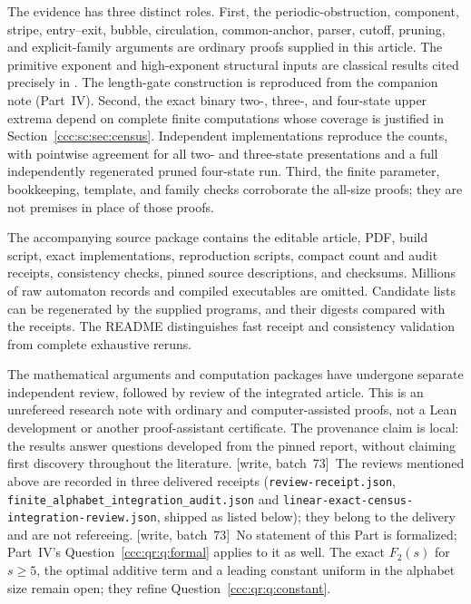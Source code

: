 \documentclass[11pt,letterpaper]{article}
\theoremstyle{definition}
\theoremstyle{remark}
\newcommand{\wsevthree}{\textup{[write, batch~73]}}
\begin{document}
The evidence has three distinct roles. First, the periodic-obstruction, component, stripe, entry--exit, bubble, circulation, common-anchor, parser, cutoff, pruning, and explicit-family arguments are ordinary proofs supplied in this article. The primitive exponent and high-exponent structural inputs are classical results cited precisely in \cite{KOV}. The length-gate construction is reproduced from the companion note (Part~IV). Second, the exact binary two-, three-, and four-state upper extrema depend on complete finite computations whose coverage is justified in Section~\ref{ccc:sc:sec:census}. Independent implementations reproduce the counts, with pointwise agreement for all two- and three-state presentations and a full independently regenerated pruned four-state run. Third, the finite parameter, bookkeeping, template, and family checks corroborate the all-size proofs; they are not premises in place of those proofs.

The accompanying source package contains the editable article, PDF, build script, exact implementations, reproduction scripts, compact count and audit receipts, consistency checks, pinned source descriptions, and checksums. Millions of raw automaton records and compiled executables are omitted. Candidate lists can be regenerated by the supplied programs, and their digests compared with the receipts. The README distinguishes fast receipt and consistency validation from complete exhaustive reruns.

The mathematical arguments and computation packages have undergone separate independent review, followed by review of the integrated article. This is an unrefereed research note with ordinary and computer-assisted proofs, not a Lean development or another proof-assistant certificate. The provenance claim is local: the results answer questions developed from the pinned report, without claiming first discovery throughout the literature.
\wsevthree\ The reviews mentioned above are recorded in three delivered
receipts (\texttt{review-receipt.json},
\texttt{finite\_alphabet\_integration\_audit.json} and
\texttt{linear-exact-census-integration-review.json}, shipped as listed
below); they belong to the delivery and are not refereeing.
\wsevthree\ No statement of this Part is formalized; Part~IV's
Question~\ref{ccc:qr:q:formal} applies to it as well. The exact $F_2(s)$ for
$s\ge5$, the optimal additive term and a leading constant uniform in the
alphabet size remain open; they refine Question~\ref{ccc:qr:q:constant}.
\end{document}
